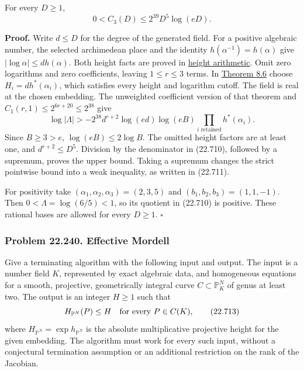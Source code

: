 \documentclass[
  11pt,
  a4paper,
]{article}
\begin{document}
For every \(D\ge1\), \[
 0<C_3(D)\le 2^{39}D^5\log(eD).
 \tag{22.711}
\]

\textbf{Proof.} Write \(d\le D\) for the degree of the generated field.
For a positive algebraic number, the selected archimedean place and the
identity \(h(\alpha^{-1})=h(\alpha)\) give
\(|\log\alpha|\le d h(\alpha)\). Both height facts are proved in
\href{https://kokunoyumeto.github.io/open-math-courses-public/courses/TR-TRANS/TR-TRANS-02.html\#4-height-arithmetic-and-finite-sets}{height
arithmetic}. Omit zero logarithms and zero coefficients, leaving
\(1\le r\le3\) terms. In
\href{https://kokunoyumeto.github.io/open-math-courses-public/courses/TR-BAKER/TR-BAKER-08.html\#4-matveev-s-homogeneous-estimate}{Theorem
8.6} choose \(H_i=d h^*(\alpha_i)\), which satisfies every height and
logarithm cutoff. The field is real at the chosen embedding. The
unweighted coefficient version of that theorem and
\(C_1(r,1)\le2^{6r+20}\le2^{38}\) give \[
 \log|\Lambda|>
 -2^{38}d^{r+2}\log(ed)\log(eB)
       \prod_{i\text{ retained}}h^*(\alpha_i).
 \tag{22.712}
\] Since \(B\ge3>e\), \(\log(eB)\le2\log B\). The omitted height factors
are at least one, and \(d^{r+2}\le D^5\). Division by the denominator in
(22.710), followed by a supremum, proves the upper bound. Taking a
supremum changes the strict pointwise bound into a weak inequality, as
written in (22.711).

For positivity take \((\alpha_1,\alpha_2,\alpha_3)=(2,3,5)\) and
\((b_1,b_2,b_3)=(1,1,-1)\). Then \(0<\Lambda=\log(6/5)<1\), so its
quotient in (22.710) is positive. These rational bases are allowed for
every \(D\ge1\). \(\square\)

\subsubsection{Problem 22.240. Effective
Mordell}\label{problem-22.240.-effective-mordell}

Give a terminating algorithm with the following input and output. The
input is a number field \(K\), represented by exact algebraic data, and
homogeneous equations for a smooth, projective, geometrically integral
curve \(C\subset\mathbb P^N_K\) of genus at least two. The output is an
integer \(H\ge1\) such that \[
 H_{\mathbb P^N}(P)\le H\quad\hbox{for every }P\in C(K),
 \tag{22.713}
\] where \(H_{\mathbb P^N}=\exp h_{\mathbb P^N}\) is the absolute
multiplicative projective height for the given embedding. The algorithm
must work for every such input, without a conjectural termination
assumption or an additional restriction on the rank of the Jacobian.
\end{document}
